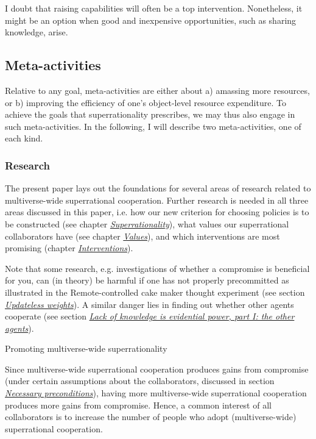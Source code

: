 I doubt that raising capabilities will often be a top intervention.
Nonetheless, it might be an option when good and inexpensive
opportunities, such as sharing knowledge, arise.

\hypertarget{meta-activities}{\subsection{Meta-activities}\label{meta-activities}}

Relative to any goal, meta-activities are either about a) amassing more
resources, or b) improving the efficiency of one's object-level resource
expenditure. To achieve the goals that superrationality prescribes, we
may thus also engage in such meta-activities. In the following, I will
describe two meta-activities, one of each kind.

\subsubsection{Research}\label{research}

The present paper lays out the foundations for several areas of research
related to multiverse-wide superrational cooperation. Further research
is needed in all three areas discussed in this paper, i.e. how our new
criterion for choosing policies is to be constructed (see chapter
\protect\hyperlink{superrationality}{\emph{Superrationality}}), what
values our superrational collaborators have (see chapter
\protect\hyperlink{values}{\emph{Values}}), and which interventions
are most promising (chapter
\protect\hyperlink{interventions}{\emph{Interventions}}).

Note that some research, e.g. investigations of whether a compromise is
beneficial for you, can (in theory) be harmful if one has not properly
precommitted as illustrated in the Remote-controlled cake maker thought
experiment (see section
\protect\hyperlink{updateless-weights}{\emph{Updateless weights}}).
A similar danger lies in finding out whether other agents cooperate (see
section
\protect\hyperlink{lack-of-knowledge-is-evidential-power-part-i-the-other-agents}{\emph{Lack
of knowledge is evidential power, part I: the other agents}}).

Promoting multiverse-wide superrationality

Since multiverse-wide superrational cooperation produces gains from
compromise (under certain assumptions about the collaborators, discussed
in section \protect\hyperlink{necessary-preconditions}{\emph{Necessary
preconditions}}), having more multiverse-wide superrational
cooperation produces more gains from compromise. Hence, a common
interest of all collaborators is to increase the number of people who
adopt (multiverse-wide) superrational cooperation.

